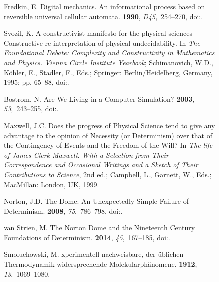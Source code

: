 \documentclass[entropy,article,accept,oneauthor,pdftex]{Definitions/mdpi}
\begin{document}
\begin{figure}[H]
\begin{thebibliography}{999}
Fredkin, E.
\newblock Digital mechanics. An informational process based on reversible
  universal cellular automata.
 {\bf 1990}, {\em D45},~254--270, doi:{\href{https://doi.org/10.1016/0167-2789(90)90186-S}{}}.

Svozil, K.
\newblock A constructivist manifesto for the physical sciences---{C}onstructive re-interpretation of physical undecidability.
\newblock  In \emph{The Foundational Debate: Complexity and Constructivity in
  Mathematics and Physics. Vienna Circle Institute Yearbook}; Schimanovich, W.D., K{\"{o}}hler, E., Stadler, F., Eds.; Springer: Berlin/Heidelberg, Germany, 1995; pp. 65--88, doi:{\href{https://doi.org/10.1007/978-94-017-3327-4\_6}{}}.

Bostrom, N.
\newblock Are We Living in a Computer Simulation?
 {\bf 2003}, {\em 53},~243--255, doi:{\href{https://doi.org/10.1111/1467-9213.00309}{}}.

Maxwell, J.C.
\newblock Does the progress of Physical Science tend to give any advantage to
  the opinion of Necessity (or Determinism) over that of the Contingency of
  Events and the Freedom of the Will? In {\em The life of {J}ames {C}lerk
  {M}axwell. {W}ith a Selection from Their Correspondence and Occasional Writings
  and a Sketch of Their Contributions to Science}, 2nd ed.;  Campbell, L., Garnett, W., Eds.; MacMillan: London, UK, 1999.%

Norton, J.D.
\newblock The Dome: An Unexpectedly Simple Failure of Determinism.
 {\bf 2008}, {\em 75},~786--798, doi:{\href{https://doi.org/10.1086/594524}{}}.

van Strien, M.
\newblock The {N}orton Dome and the Nineteenth Century Foundations of
  Determinism.
 {\bf 2014}, {\em 45},~167--185, doi:{\href{https://doi.org/10.1007/s10838-014-9241-0}{}}.

Smoluchowski, M.
xperimentell nachweisbare, der {\"u}blichen {T}hermodynamik
  widersprechende {M}olekularph{\"a}nomene.
 {\bf 1912}, {\em 13},~1069--1080.


\end{thebibliography}
\end{figure}
\end{document}
